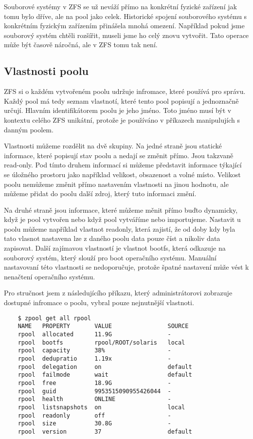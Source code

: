     Souborové systémy v ZFS se už neváží přímo na konkrétní fyzické zařízení jak tomu bylo dříve, ale na pool jako celek. Historické spojení souborového systému s konkrétním fyzickým zařízením přinášela mnohá omezení. Například pokud jsme souborový systém chtěli rozšířit, museli jsme ho celý znovu vytvořit. Tato operace může být časově náročná, ale
    v ZFS tomu tak není.
    \subsection{Vlastnosti poolu}
    ZFS si o každém vytvořeném poolu udržuje infromace, které používá pro správu. Každý pool má tedy seznam vlastnotí, které tento pool popisují a jednoznačně určují.
    Hlavním identifikátorem poolu je jeho jméno. Toto jméno musí být v kontextu celého ZFS unikátní, protože je používáno v příkazech manipulujích s danným poolem.

    Vlastnosti můžeme rozdělit na dvě skupiny. Na jedné straně jsou statické informace, které popisují stav poolu a nedají se změnit přímo. Jsou takzvaně read-only. Pod tímto druhem informací si můžeme představit informace týkající se úložného prostoru jako například velikost, obsazenost a volné místo. Velikost poolu nemůžeme změnit přímo nastavením vlastnosti na jinou hodnotu, ale můžeme přidat do poolu další zdroj, který tuto informaci změní.

    Na druhé straně jsou informace, které můžeme měnit přímo buďto dynamicky, když je pool vytvořen nebo když pool vytváříme nebo importujeme. Nastavit u poolu můžeme například vlastnot readonly, která zajistí, že od doby kdy byla tato vlasnot nastavena lze z daného poolu data pouze číst a nikoliv data zapisovat. Další zajímavou vlastností je vlastnot bootfs, která odkazuje na souborový systém, který slouží pro boot operačního systému. Manuální nastavovaní této vlastnosti se nedoporučuje, protože špatné nastavení může vést k nenačtení operačního systému.

    Pro stručnost jsem z následujícího příkazu, který administrátorovi zobrazuje dostupné infromace o poolu, vybral pouze nejnutnější vlastnoti.
    \begin{verbatim}
    $ zpool get all rpool
    NAME   PROPERTY       VALUE                SOURCE
    rpool  allocated      11.9G                -
    rpool  bootfs         rpool/ROOT/solaris   local
    rpool  capacity       38%                  -
    rpool  dedupratio     1.19x                -
    rpool  delegation     on                   default
    rpool  failmode       wait                 default
    rpool  free           18.9G                -
    rpool  guid           9953515090955426044  -
    rpool  health         ONLINE               -
    rpool  listsnapshots  on                   local
    rpool  readonly       off                  -
    rpool  size           30.8G                -
    rpool  version        37                   default
    \end{verbatim}

